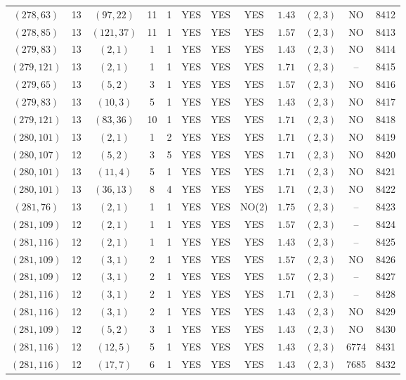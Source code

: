 \begin{longtable}{|c|c|c|c|c|c|c|c|c|c|c|c|}
$(278,63)$ & 13 & $(97,22)$ & 11 & 1 & YES & YES & YES & $1.43$ & $(2,3)$ & NO & 8412\\
$(278,85)$ & 13 & $(121,37)$ & 11 & 1 & YES & YES & YES & $1.57$ & $(2,3)$ & NO & 8413\\
$(279,83)$ & 13 & $(2,1)$ & 1 & 1 & YES & YES & YES & $1.43$ & $(2,3)$ & NO & 8414\\
$(279,121)$ & 13 & $(2,1)$ & 1 & 1 & YES & YES & YES & $1.71$ & $(2,3)$ & -- & 8415\\
$(279,65)$ & 13 & $(5,2)$ & 3 & 1 & YES & YES & YES & $1.57$ & $(2,3)$ & NO & 8416\\
$(279,83)$ & 13 & $(10,3)$ & 5 & 1 & YES & YES & YES & $1.43$ & $(2,3)$ & NO & 8417\\
$(279,121)$ & 13 & $(83,36)$ & 10 & 1 & YES & YES & YES & $1.71$ & $(2,3)$ & NO & 8418\\
$(280,101)$ & 13 & $(2,1)$ & 1 & 2 & YES & YES & YES & $1.71$ & $(2,3)$ & NO & 8419\\
$(280,107)$ & 12 & $(5,2)$ & 3 & 5 & YES & YES & YES & $1.71$ & $(2,3)$ & NO & 8420\\
$(280,101)$ & 13 & $(11,4)$ & 5 & 1 & YES & YES & YES & $1.71$ & $(2,3)$ & NO & 8421\\
$(280,101)$ & 13 & $(36,13)$ & 8 & 4 & YES & YES & YES & $1.71$ & $(2,3)$ & NO & 8422\\
$(281,76)$ & 13 & $(2,1)$ & 1 & 1 & YES & YES & NO(2) & $1.75$ & $(2,3)$ & -- & 8423\\
$(281,109)$ & 12 & $(2,1)$ & 1 & 1 & YES & YES & YES & $1.57$ & $(2,3)$ & -- & 8424\\
$(281,116)$ & 12 & $(2,1)$ & 1 & 1 & YES & YES & YES & $1.43$ & $(2,3)$ & -- & 8425\\
$(281,109)$ & 12 & $(3,1)$ & 2 & 1 & YES & YES & YES & $1.57$ & $(2,3)$ & NO & 8426\\
$(281,109)$ & 12 & $(3,1)$ & 2 & 1 & YES & YES & YES & $1.57$ & $(2,3)$ & -- & 8427\\
$(281,116)$ & 12 & $(3,1)$ & 2 & 1 & YES & YES & YES & $1.71$ & $(2,3)$ & -- & 8428\\
$(281,116)$ & 12 & $(3,1)$ & 2 & 1 & YES & YES & YES & $1.43$ & $(2,3)$ & NO & 8429\\
$(281,109)$ & 12 & $(5,2)$ & 3 & 1 & YES & YES & YES & $1.43$ & $(2,3)$ & NO & 8430\\
$(281,116)$ & 12 & $(12,5)$ & 5 & 1 & YES & YES & YES & $1.43$ & $(2,3)$ & 6774 & 8431\\
$(281,116)$ & 12 & $(17,7)$ & 6 & 1 & YES & YES & YES & $1.43$ & $(2,3)$ & 7685 & 8432\\

\end{longtable}

